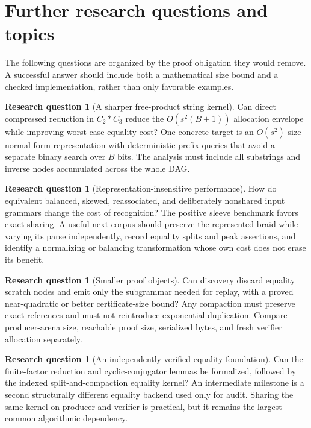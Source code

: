 \documentclass[11pt,letterpaper]{article}
\theoremstyle{definition}\newtheorem{definition}[theorem]{Definition}
\newtheorem{question}[theorem]{Research question}
\theoremstyle{remark}\newtheorem{remark}[theorem]{Remark}
\begin{document}
\section{Further research questions and topics}
The following questions are organized by the proof obligation they would remove. A successful answer should include both a mathematical size bound and a checked implementation, rather than only favorable examples.

\begin{question}[A sharper free-product string kernel]
Can direct compressed reduction in $C_2*C_3$ reduce the $O(s^2(B+1))$ allocation envelope while improving worst-case equality cost? One concrete target is an $O(s^2)$-size normal-form representation with deterministic prefix queries that avoid a separate binary search over $B$ bits. The analysis must include all substrings and inverse nodes accumulated across the whole DAG.
\end{question}

\begin{question}[Representation-insensitive performance]
How do equivalent balanced, skewed, reassociated, and deliberately nonshared input grammars change the cost of recognition? The positive sleeve benchmark favors exact sharing. A useful next corpus should preserve the represented braid while varying its parse independently, record equality splits and peak assertions, and identify a normalizing or balancing transformation whose own cost does not erase its benefit.
\end{question}

\begin{question}[Smaller proof objects]
Can discovery discard equality scratch nodes and emit only the subgrammar needed for replay, with a proved near-quadratic or better certificate-size bound? Any compaction must preserve exact references and must not reintroduce exponential duplication. Compare producer-arena size, reachable proof size, serialized bytes, and fresh verifier allocation separately.
\end{question}

\begin{question}[An independently verified equality foundation]
Can the finite-factor reduction and cyclic-conjugator lemmas be formalized, followed by the indexed split-and-compaction equality kernel? An intermediate milestone is a second structurally different equality backend used only for audit. Sharing the same kernel on producer and verifier is practical, but it remains the largest common algorithmic dependency.
\end{question}
\end{document}
